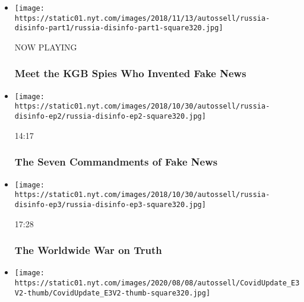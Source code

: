 \begin{itemize}
\item
  \texttt{[image: https://static01.nyt.com/images/2018/11/13/autossell/russia-disinfo-part1/russia-disinfo-part1-square320.jpg]}

  NOW PLAYING

  \hypertarget{meet-the-kgb-spies-who-invented-fake-news-2}{%
  \subsubsection{Meet the KGB Spies Who Invented Fake
  News}\label{meet-the-kgb-spies-who-invented-fake-news-2}}
\item
  \href{https://www.nytimes.com/video/opinion/100000006188102/what-is-pizzagate.html?action=click\&module=video-series-bar\&region=header\&pgtype=Article\&playlistId=video/opinion}{}

  \texttt{[image: https://static01.nyt.com/images/2018/10/30/autossell/russia-disinfo-ep2/russia-disinfo-ep2-square320.jpg]}

  14:17

  \hypertarget{the-seven-commandments-of-fake-news}{%
  \subsubsection{The Seven Commandments of Fake
  News}\label{the-seven-commandments-of-fake-news}}
\item
  \href{https://www.nytimes.com/video/opinion/100000006188105/countering-disinformation-active-measures.html?action=click\&module=video-series-bar\&region=header\&pgtype=Article\&playlistId=video/opinion}{}

  \texttt{[image: https://static01.nyt.com/images/2018/10/30/autossell/russia-disinfo-ep3/russia-disinfo-ep3-square320.jpg]}

  17:28

  \hypertarget{the-worldwide-war-on-truth}{%
  \subsubsection{The Worldwide War on
  Truth}\label{the-worldwide-war-on-truth}}
\item
  \href{https://www.nytimes.com/video/opinion/100000007278127/coronavirus-vaccine-update.html?action=click\&module=video-series-bar\&region=header\&pgtype=Article\&playlistId=video/opinion}{}

  \texttt{[image: https://static01.nyt.com/images/2020/08/08/autossell/CovidUpdate\_E3V2-thumb/CovidUpdate\_E3V2-thumb-square320.jpg]}


\end{itemize}

